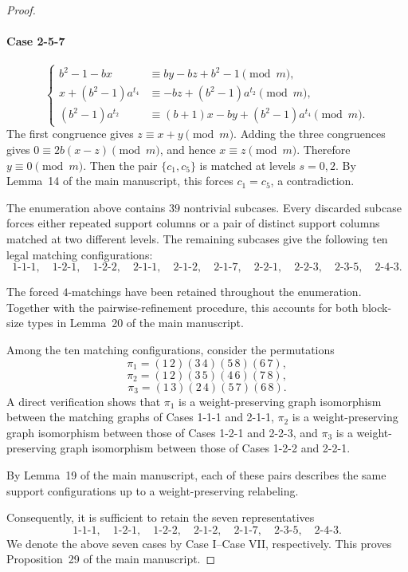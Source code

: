 \documentclass[11pt]{article}
\newcommand{\mymod}{\pmod{m}}
\begin{document}
\begin{proof}
\paragraph{Case 2-5-7}
$$
\begin{cases}
	b^2-1-bx &\equiv by-bz+b^2-1\mymod, \\
	x+(b^2-1)a^{t_4} &\equiv -bz+(b^2-1)a^{t_2}\mymod, \\
	(b^2-1)a^{t_2} &\equiv (b+1)x-by+(b^2-1)a^{t_4}\mymod.
\end{cases}
$$
The first congruence gives $z\equiv x+y\mymod$. Adding the three
congruences gives $0\equiv2b(x-z)\mymod$, and hence $x\equiv z\mymod$.
Therefore $y\equiv0\mymod$. Then the pair $\{c_1,c_5\}$ is matched at levels $s=0,2$. By Lemma~14 of the main manuscript, this forces
$c_1=c_5$, a contradiction.

The enumeration above contains $39$ nontrivial subcases. Every
discarded subcase forces either repeated support columns or a pair of
distinct support columns matched at two different levels. The
remaining subcases give the following ten legal matching
configurations:
$$
1\text{-}1\text{-}1,\quad
1\text{-}2\text{-}1,\quad
1\text{-}2\text{-}2,\quad
2\text{-}1\text{-}1,\quad
2\text{-}1\text{-}2,\quad
2\text{-}1\text{-}7,\quad
2\text{-}2\text{-}1,\quad
2\text{-}2\text{-}3,\quad
2\text{-}3\text{-}5,\quad
2\text{-}4\text{-}3.
$$

The forced $4$-matchings have been retained throughout the enumeration. Together with the pairwise-refinement procedure, this accounts for both block-size types in Lemma~20 of the main manuscript.

Among the ten matching configurations, consider the permutations
$$
\pi_1=(1\,2)(3\,4)(5\,8)(6\,7),
$$
$$
\pi_2=(1\,2)(3\,5)(4\,6)(7\,8),
$$
$$
\pi_3=(1\,3)(2\,4)(5\,7)(6\,8).
$$
A direct verification shows that $\pi_1$ is a weight-preserving
graph isomorphism between the matching graphs of Cases 1-1-1
and 2-1-1, $\pi_2$ is a weight-preserving graph isomorphism
between those of Cases 1-2-1 and 2-2-3, and $\pi_3$ is a
weight-preserving graph isomorphism between those of Cases
1-2-2 and 2-2-1.

By Lemma~19 of the main manuscript, each of these pairs describes the same support configurations up to a weight-preserving relabeling.

Consequently, it is sufficient to retain the seven representatives
$$
1\text{-}1\text{-}1,\quad
1\text{-}2\text{-}1,\quad
1\text{-}2\text{-}2,\quad
2\text{-}1\text{-}2,\quad
2\text{-}1\text{-}7,\quad
2\text{-}3\text{-}5,\quad
2\text{-}4\text{-}3.
$$
We denote the above seven cases by Case I--Case VII, respectively.
This proves Proposition~29 of the main manuscript.
\end{proof}
\end{document}
